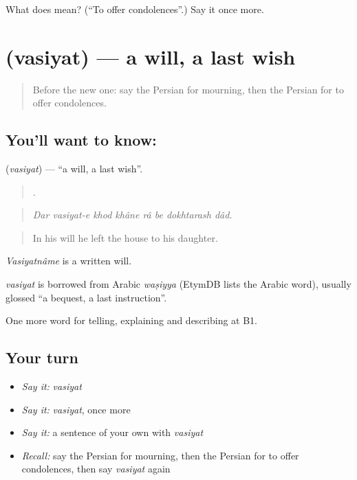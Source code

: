\begin{tcolorbox}[breakable,colback=teal!4,colframe=teal!35!black,title={Before you move on}]
What does   mean? (\textquotedblleft{}To offer condolences\textquotedblright{}.) Say it once more.
\end{tcolorbox}
\section[\texorpdfstring{\fa{وصیت} (vasiyat)}{وصیت (vasiyat)}]{ (vasiyat) — a will, a last wish}

\label{lesson:FA-C338-vasiyat}



\begin{quote}
Before the new one: say the Persian for mourning, then the Persian for to offer condolences.
\end{quote}

\subsection*{You'll want to know: }
\textbf{} (\emph{vasiyat}) — \textquotedblleft{}a will, a last wish\textquotedblright{}.

\begin{quote}
       .
\end{quote}

\begin{quote}
\emph{Dar vasiyat-e khod khâne râ be dokhtarash dâd.}
\end{quote}

\begin{quote}
In his will he left the house to his daughter.
\end{quote}

\emph{Vasiyatnâme} is a written will.

\begin{cousinweb}
\emph{vasiyat} is borrowed from Arabic \emph{waṣiyya} (EtymDB lists the Arabic word), usually glossed \textquotedblleft{}a bequest, a last instruction\textquotedblright{}.
\end{cousinweb}

\begin{grammarlens}[title={What you've built}]
One more word for telling, explaining and describing at B1.
\end{grammarlens}

\subsection*{Your turn}
\begin{itemize}
\raggedright
  \item \emph{Say it:} \emph{vasiyat}
  \item \emph{Say it:} \emph{vasiyat}, once more
  \item \emph{Say it:} a sentence of your own with \emph{vasiyat}
  \item \emph{Recall:} say the Persian for mourning, then the Persian for to offer condolences, then say \emph{vasiyat} again
\end{itemize}

